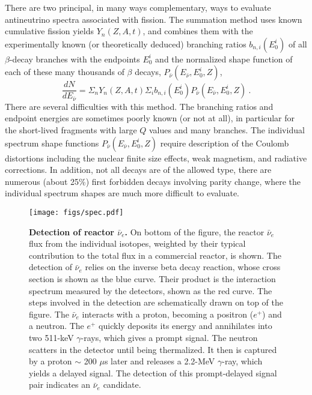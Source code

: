 There are two principal, in many ways complementary, ways to evaluate antineutrino spectra associated with fission. 
 The summation method uses known cumulative fission yields $Y_n (Z,A,t)$, and combines them
 with the experimentally known (or theoretically deduced) branching ratios $b_{n,i}(E^i_0)$ of all $\beta$-decay branches with the endpoints $E^i_0$ and the
 normalized shape function of each of these many thousands of $\beta$ decays, $P_{\bar{\nu}} (E_{\bar{\nu}},E^i_0,Z)$,
 \begin{equation}
 \frac{dN}{dE_{\bar{\nu}}} = \Sigma_n Y_n (Z,A,t) \Sigma_i b_{n,i}(E^i_0) P_{\bar{\nu}} (E_{\bar{\nu}},E^i_0,Z) ~.
 \end{equation}
 There are several difficulties with this method. The branching ratios and endpoint energies are sometimes poorly known (or not at all), in particular for
 the short-lived fragments with large $Q$ values and many branches. The individual spectrum shape functions $P_{\bar{\nu}} (E_{\bar{\nu}},E^i_0,Z)$
 require description of the Coulomb distortions including the nuclear finite size effects, weak magnetism, and radiative corrections. In addition, not all
 decays are of the allowed type, there are numerous (about 25\%) first forbidden decays involving parity change, where the individual spectrum 
 shapes are much more difficult to evaluate. 
 
 \begin{figure}[tb]
 \begin{centering}
 \texttt{[image: figs/spec.pdf]}
 \par\end{centering}
 \caption{\label{fig:spectra} {\bf Detection of reactor $\bar{\nu}_e$.} On bottom of the figure, the reactor $\bar{\nu}_e$ flux from the individual isotopes, weighted by their typical contribution to the total flux in a commercial reactor, is shown. The detection of $\bar{\nu}_e$ relies on the inverse beta decay reaction, whose cross section is shown as the blue curve. Their product is the interaction spectrum measured by the detectors, shown as the red curve. 
 The steps involved in the detection are schematically drawn on top of the figure. The $\bar{\nu}_e$ interacts with a proton, becoming a positron ($e^+$) and a neutron. The $e^+$ quickly deposits its energy and annihilates into two 511-keV $\gamma$-rays, which gives a prompt signal. The neutron scatters in the detector until being thermalized. It then is captured by a proton $\sim$ 200 $\mu$s later and releases a 2.2-MeV $\gamma$-ray, which yields a delayed signal. The detection of this prompt-delayed signal pair indicates an $\bar{\nu}_e$ candidate.}
 \end{figure}
 

